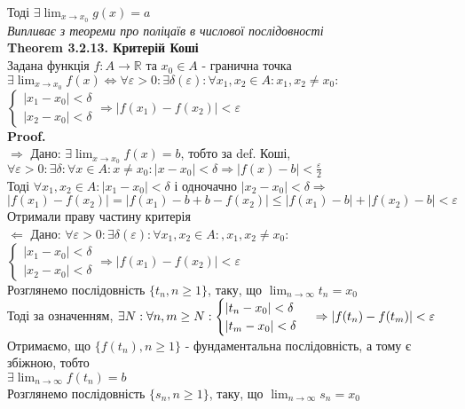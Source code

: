 \documentclass[a4paper, 14pt]{extarticle}
\def\huge{\displaystyle}
\def\bigline{\vspace{5mm}\\}
\def\th#1{\textbf{Theorem {#1}}}
\def\proof{\textbf{Proof.}\\}
\def\bigline{\vspace{5mm}\\}
\begin{document}
Тоді $\exists \huge \lim_{x \to x_0} g(x) = a$\\
\textit{Випливає з теореми про поліцаїв в числової послідовності}
\bigline
\th{3.2.13. Критерій Коші}\\
Задана функція $f: A \to \mathbb{R}$ та $x_0 \in A$ - гранична точка\\
$\exists \huge \lim_{x \to x_0} f(x) \iff \forall \varepsilon > 0: \exists \delta(\varepsilon): \forall x_1,x_2 \in A: x_1,x_2 \neq x_0:$\\
$\begin{cases} |x_1-x_0|<\delta \\ |x_2-x_0|<\delta \end{cases} \Rightarrow |f(x_1)-f(x_2)|<\varepsilon
$\\
\proof
$\boxed{\Rightarrow}$ Дано: $\exists \huge \lim_{x \to x_0} f(x) = b$, тобто за def. Коші,\\
$\forall \varepsilon > 0: \exists \delta: \forall x \in A: x \neq x_0: |x-x_0|<\delta \Rightarrow |f(x)-b|< \huge \frac{\varepsilon}{2}$\\
Тоді $\forall x_1, x_2 \in A: |x_1 - x_0| < \delta$ і одночачно $|x_2 - x_0| < \delta \Rightarrow$\\
$|f(x_1)-f(x_2)| = |f(x_1)-b + b - f(x_2)| \leq |f(x_1) - b| + |f(x_2)-b| < \varepsilon$\\
Отримали праву частину критерія
\bigline
$\boxed{\Leftarrow}$ Дано: $\forall \varepsilon > 0: \exists \delta(\varepsilon): \forall x_1,x_2 \in A:, x_1,x_2 \neq x_0:$
$\begin{cases} |x_1-x_0|<\delta \\ |x_2-x_0|<\delta \end{cases} \Rightarrow |f(x_1)-f(x_2)|<\varepsilon$\\
Розглянемо послідовність $\{t_n, n \geq 1\}$, таку, що $\huge \lim_{n \to \infty} t_n = x_0$\\
Тоді за означенням, $\exists N: \forall n,m \geq N: \begin{cases} |t_n-x_0|<\delta \\ |t_m-x_0|<\delta \end{cases} \\ \Rightarrow |f(t_n)-f(t_m)|<\varepsilon$\\
Отримаємо, що $\{f(t_n),n \geq 1\}$ - фундаментальна послідовність, а тому є збіжною, тобто\\
$\exists \huge \lim_{n \to \infty} f(t_n) = b$\\
Розглянемо послідовність $\{s_n, n \geq 1\}$, таку, що $\huge \lim_{n \to \infty} s_n = x_0$\\
\end{document}
